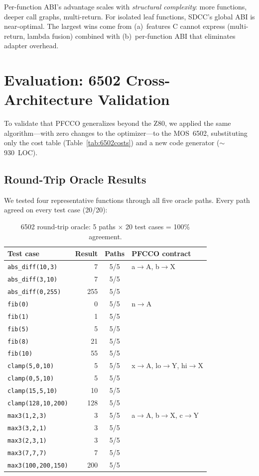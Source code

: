 \documentclass[sigplan,screen,nonacm]{acmart}
\begin{document}
Per-function ABI's advantage scales with \emph{structural complexity}: more
functions, deeper call graphs, multi-return.  For isolated leaf functions,
SDCC's global ABI is near-optimal.  The largest wins come from (a)~features
C cannot express (multi-return, lambda fusion) combined with (b)~per-function
ABI that eliminates adapter overhead.

\section{Evaluation: 6502 Cross-Architecture Validation}
\label{sec:eval:6502}

To validate that PFCCO generalizes beyond the Z80, we applied the same
algorithm---with zero changes to the optimizer---to the MOS~6502, substituting
only the cost table (Table~\ref{tab:6502costs}) and a new code generator
($\sim$930~LOC).

\subsection{Round-Trip Oracle Results}

We tested four representative functions through all five oracle paths.
Every path agreed on every test case (20/20):

\begin{table}[h]
\centering\small
\caption{6502 round-trip oracle: 5 paths $\times$ 20 test cases = 100\% agreement.}
\label{tab:6502oracle}
\begin{tabular}{@{}lrcl@{}}
\toprule
Test case & Result & Paths & PFCCO contract \\
\midrule
\texttt{abs\_diff(10,3)}   & 7   & 5/5 & a$\to$A, b$\to$X \\
\texttt{abs\_diff(3,10)}   & 7   & 5/5 & \\
\texttt{abs\_diff(0,255)}  & 255 & 5/5 & \\
\texttt{fib(0)} & 0  & 5/5 & n$\to$A \\
\texttt{fib(1)} & 1  & 5/5 & \\
\texttt{fib(5)} & 5  & 5/5 & \\
\texttt{fib(8)} & 21 & 5/5 & \\
\texttt{fib(10)} & 55 & 5/5 & \\
\texttt{clamp(5,0,10)}   & 5  & 5/5 & x$\to$A, lo$\to$Y, hi$\to$X \\
\texttt{clamp(0,5,10)}   & 5  & 5/5 & \\
\texttt{clamp(15,5,10)}  & 10 & 5/5 & \\
\texttt{clamp(128,10,200)} & 128 & 5/5 & \\
\texttt{max3(1,2,3)}     & 3   & 5/5 & a$\to$A, b$\to$X, c$\to$Y \\
\texttt{max3(3,2,1)}     & 3   & 5/5 & \\
\texttt{max3(2,3,1)}     & 3   & 5/5 & \\
\texttt{max3(7,7,7)}     & 7   & 5/5 & \\
\texttt{max3(100,200,150)} & 200 & 5/5 & \\
\bottomrule
\end{tabular}
\end{table}
\end{document}
